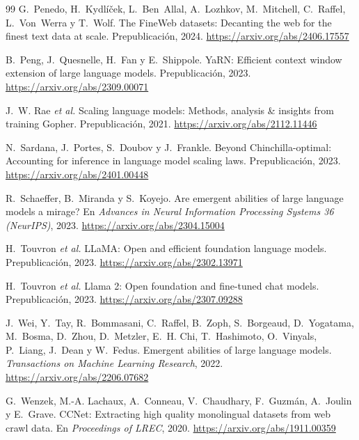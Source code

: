 \begin{thebibliography}{99}
G.~Penedo, H.~Kydlíček, L.~Ben~Allal, A.~Lozhkov, M.~Mitchell, C.~Raffel, L.~Von~Werra y T.~Wolf.
\newblock The FineWeb datasets: Decanting the web for the finest text data at scale.
\newblock Prepublicación, 2024.
\newblock \url{https://arxiv.org/abs/2406.17557}

B.~Peng, J.~Quesnelle, H.~Fan y E.~Shippole.
\newblock YaRN: Efficient context window extension of large language models.
\newblock Prepublicación, 2023.
\newblock \url{https://arxiv.org/abs/2309.00071}

J.~W. Rae \emph{et al.}
\newblock Scaling language models: Methods, analysis \& insights from training Gopher.
\newblock Prepublicación, 2021.
\newblock \url{https://arxiv.org/abs/2112.11446}

N.~Sardana, J.~Portes, S.~Doubov y J.~Frankle.
\newblock Beyond Chinchilla-optimal: Accounting for inference in language model scaling laws.
\newblock Prepublicación, 2023.
\newblock \url{https://arxiv.org/abs/2401.00448}

R.~Schaeffer, B.~Miranda y S.~Koyejo.
\newblock Are emergent abilities of large language models a mirage?
\newblock En \emph{Advances in Neural Information Processing Systems 36 (NeurIPS)}, 2023.
\newblock \url{https://arxiv.org/abs/2304.15004}

H.~Touvron \emph{et al.}
\newblock LLaMA: Open and efficient foundation language models.
\newblock Prepublicación, 2023.
\newblock \url{https://arxiv.org/abs/2302.13971}

H.~Touvron \emph{et al.}
\newblock Llama 2: Open foundation and fine-tuned chat models.
\newblock Prepublicación, 2023.
\newblock \url{https://arxiv.org/abs/2307.09288}

J.~Wei, Y.~Tay, R.~Bommasani, C.~Raffel, B.~Zoph, S.~Borgeaud, D.~Yogatama, M.~Bosma, D.~Zhou, D.~Metzler, E.~H. Chi, T.~Hashimoto, O.~Vinyals, P.~Liang, J.~Dean y W.~Fedus.
\newblock Emergent abilities of large language models.
\newblock \emph{Transactions on Machine Learning Research}, 2022.
\newblock \url{https://arxiv.org/abs/2206.07682}

G.~Wenzek, M.-A. Lachaux, A.~Conneau, V.~Chaudhary, F.~Guzmán, A.~Joulin y E.~Grave.
\newblock CCNet: Extracting high quality monolingual datasets from web crawl data.
\newblock En \emph{Proceedings of LREC}, 2020.
\newblock \url{https://arxiv.org/abs/1911.00359}

\end{thebibliography}
